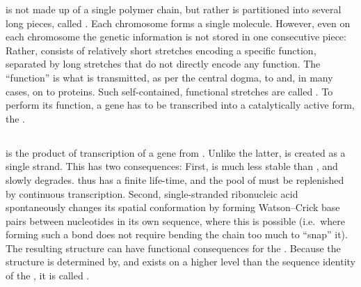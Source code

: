 \begin{figure}
    \hspace{-\dimexpr\oddsidemargin+1in}%
\end{figure}

\dna is not made up of a single polymer chain, but rather is partitioned into
several long pieces, called . Each chromosome forms a single
molecule. However, even on each chromosome the genetic information is not stored
in one consecutive piece: Rather, \dna consists of relatively short stretches
encoding a specific function, separated by long stretches that do not directly
encode any function. The “function” is what is transmitted, as per the central
dogma, to \rna and, in many cases, on to proteins. Such self-contained,
functional stretches are called . To perform its
function, a gene has to be transcribed into a catalytically active form, the
\rna.

\subsection{}

\rna is the product of transcription of a gene from \dna. Unlike the latter,
\rna is created as a single strand. This has two consequences: First, \rna is
much less stable than \dna, and slowly degrades. \rna thus has a finite
life-time, and the pool of \rna must be replenished by continuous transcription.
Second, single-stranded ribonucleic acid spontaneously changes its spatial
conformation by forming Watson--Crick base pairs between nucleotides in its own
sequence, where this is  possible (i.e.\ where forming such a bond
does not require bending the chain too much to “snap” it). The resulting
structure can have functional consequences for the \rna. Because the structure
is determined by, and exists on a higher level than the sequence identity of the
\rna, it is called .

